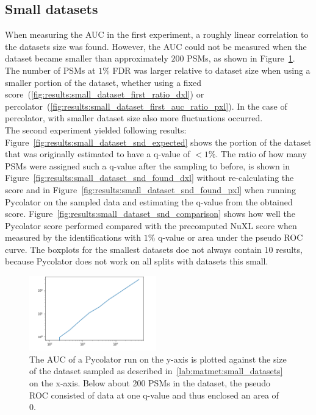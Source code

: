 \subsection{Small datasets}
\label{lab:results:small_datasets}
When measuring the AUC in the first experiment, a roughly linear correlation to the datasets size was found. However, the AUC could not be measured when the dataset became smaller than approximately $200$ PSMs, as shown in Figure~\ref{fig:results:small_dataset_first_auc}. The number of PSMs at $1\%$ FDR was larger relative to dataset size when using a smaller portion of the dataset, whether using a fixed score~(\ref{fig:results:small_dataset_first_ratio_dxl}) or percolator~(\ref{fig:results:small_dataset_first_auc_ratio_pxl}). In the case of percolator, with smaller dataset size also more fluctuations occurred.\\
The second experiment yielded following results: Figure~\ref{fig:results:small_dataset_snd_expected} shows the portion of the dataset that was originally estimated to have a q-value of $<1\%$. The ratio of how many PSMs were assigned such a q-value after the sampling to before, is shown in Figure~\ref{fig:results:small_dataset_snd_found_dxl} without re-calculating the score and in Figure~\ref{fig:results:small_dataset_snd_found_pxl} when running Pycolator on the sampled data and estimating the q-value from the obtained score. Figure~\ref{fig:results:small_dataset_snd_comparison} shows how well the Pycolator score performed compared with the precomputed NuXL score when measured by the identifications with $1\%$ q-value or area under the pseudo ROC curve. The boxplots for the smallest datasets doe not always contain 10 results, because Pycolator does not work on all splits with datasets this small. \\
\renewcommand{\baselinestretch}{0.9}
\begin{figure}
	\normalsize
	\centering
	\includegraphics[width = 0.49\textwidth]{figures/aucs_perc.png}
	\caption[Correlation between AUC and dataset size]{The AUC of a Pycolator run on the y-axis is plotted against the size of the dataset sampled as described in~\ref{lab:matmet:small_datasets} on the x-axis. Below about 200 PSMs in the dataset, the pseudo ROC consisted of data at one q-value and thus enclosed an area of 0.}
	\label{fig:results:small_dataset_first_auc}
\end{figure}
